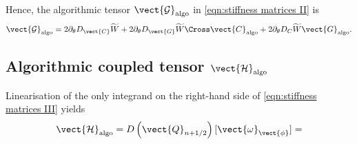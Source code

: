Hence, the algorithmic tensor $\vect{\mathcal{G}}_{\text{algo}}$ in 
\eqref{eqn:stiffness matrices II} is
%
\begin{equation}
\vect{\mathcal{G}}_{\text{algo}}=2\partial_{\theta}D_{\vect{C}}\widetilde{W} + 2\partial_{\theta}D_{\vect{G}}\widetilde{W}\Cross\vect{C}_{\text{algo}} + 2\partial_{\theta}D_{{C}}\widetilde{W}\vect{G}_{\text{algo}}.
\end{equation}

\subsection{Algorithmic coupled tensor $\vect{\mathcal{H}}_{\text{algo}}$}\label{sec:coupled tensor 2}

Linearisation of the only integrand on the right-hand side of \eqref{eqn:stiffness matrices III} yields
%
\begin{equation}
\begin{aligned}
\vect{\mathcal{H}}_{\text{algo}}=D\left(\vect{Q}_{n+1/2}\right)[\vect{\omega}_{\vect{\phi}}] = 
\end{aligned}
\end{equation}

